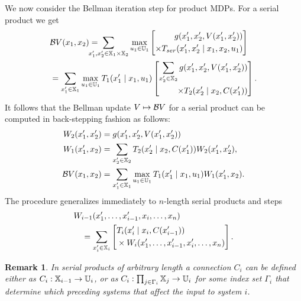 \documentclass[conference]{IEEEtran}
\newtheorem{remark}{Remark}
\begin{document}
We now consider the Bellman iteration step for product MDPs. For a serial product we get
\begin{equation*}
\begin{aligned}
  & \bellman V (x_1, x_2) = \hspace{-5mm} \sum_{x_1', x_2' \in \X_1 \times \X_2} \max_{u_1 \in \U_1} \left[ \begin{aligned}
  	g(x_1', x_2', V(x_1', x_2')) \\
  	\times T_{ser}(x_1', x_2' \mid x_1, x_2, u_1)
  \end{aligned} \right] \\
  & = \sum_{x_1' \in \X_1} \max_{u_1 \in \U_1} T_1(x_1' \mid x_1, u_1 ) \left[ \begin{aligned}
   	\sum_{x_2' \in \X_2}  g(x_1', x_2', V(x_1', x_2')) \\
   	\times  T_2(x_2' \mid x_2, C(x_1'))
   \end{aligned} \right].
\end{aligned}
\end{equation*}
It follows that the Bellman update $V \mapsto \mathcal{B} V$ for a serial product can be computed in back-stepping fashion as follows:
\begin{equation*}
\begin{aligned}
  W_2(x_1', x_2') & = g(x_1', x_2', V(x_1', x_2')) \\
  W_1(x_1', x_2) & = \sum_{x_2' \in \mathbb{X}_2}  T_2(x_2' \mid x_2, C(x_1')) W_2(x_1', x_2'), \\
  \mathcal{B} V(x_1, x_2) & = \sum_{x_1' \in \mathbb{X}_1} \max_{u_1 \in \mathbb{U}_1} T_1(x_1' \mid x_1, u_1) W_1(x_1', x_2).
\end{aligned}
\end{equation*}
The procedure generalizes immediately to $n$-length serial products and steps
\begin{equation}
\label{eq:general_decomp}
\begin{aligned}
  & W_{i-1}(x_1', \ldots, x_{i-1}', x_i, \ldots, x_n) \\
  & \quad = \sum_{x_{i}' \in \X_{i}} \left[ \begin{aligned} & T_{i} (x_{i}' \mid x_{i}, C(x_{i-1}')) \\ 
   & \times W_{i} (x_1', \ldots, x_{i-1}', x_i', \ldots, x_n)
    \end{aligned} \right].
\end{aligned}
\end{equation}

\begin{remark}
  In serial products of arbitrary length a connection $C_i$ can be defined either as $C_i: \mathbb{X}_{i-1} \rightarrow \mathbb{U}_i$, or as $C_i: \prod_{j \in \Gamma_i} \mathbb{X}_j \rightarrow \mathbb{U}_i$ for some index set $\Gamma_i$ that determine which preceding systems that affect the input to system $i$.
\end{remark}
\end{document}
